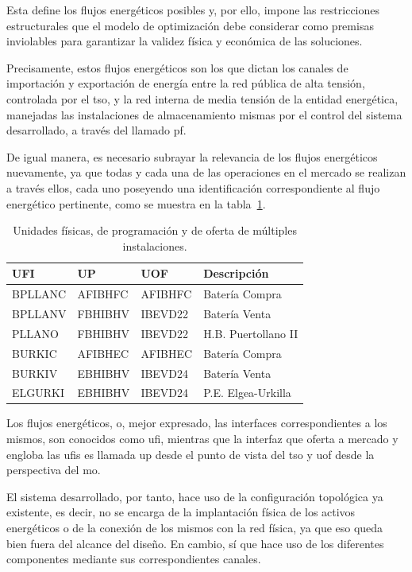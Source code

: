 Esta define los flujos energéticos posibles y, por ello, impone las restricciones estructurales que el modelo de optimización debe considerar como premisas inviolables para garantizar la validez física y económica de las soluciones.

Precisamente, estos flujos energéticos son los que dictan los canales de importación y exportación de energía entre la red pública de alta tensión, controlada por el \gls{tso}, y la red interna de media tensión de la entidad energética, manejadas las instalaciones de almacenamiento mismas por el control del sistema desarrollado, a través del llamado \gls{pf}.

De igual manera, es necesario subrayar la relevancia de los flujos energéticos nuevamente, ya que todas y cada una de las operaciones en el mercado se realizan a través ellos, cada uno poseyendo una identificación correspondiente al flujo energético pertinente, como se muestra en la tabla~\ref{tab:unidades-fisicas}.

\begin{table}[ht]
  \centering
  \begin{tabular}{|l|l|l|l|}
    \hline
    UFI     & UP      & UOF     & Descripción         \\
    \hline
    BPLLANC & AFIBHFC & AFIBHFC & Batería Compra      \\
    BPLLANV & FBHIBHV & IBEVD22 & Batería Venta       \\
    PLLANO  & FBHIBHV & IBEVD22 & H.B. Puertollano II \\
    BURKIC  & AFIBHEC & AFIBHEC & Batería Compra      \\
    BURKIV  & EBHIBHV & IBEVD24 & Batería Venta       \\
    ELGURKI & EBHIBHV & IBEVD24 & P.E. Elgea-Urkilla  \\
    \hline
  \end{tabular}
  \caption[Unidades físicas, de programación y de oferta.]{Unidades físicas, de programación y de oferta de múltiples instalaciones.}
  \label{tab:unidades-fisicas}
\end{table}

Los flujos energéticos, o, mejor expresado, las interfaces correspondientes a los mismos, son conocidos como \gls{ufi}, mientras que la interfaz que oferta a mercado y engloba las \glspl{ufi} es llamada \gls{up} desde el punto de vista del \gls{tso} y \gls{uof} desde la perspectiva del \gls{mo}.

El sistema desarrollado, por tanto, hace uso de la configuración topológica ya existente, es decir, no se encarga de la implantación física de los activos energéticos o de la conexión de los mismos con la red física, ya que eso queda bien fuera del alcance del diseño. En cambio, sí que hace uso de los diferentes componentes mediante sus correspondientes canales.

